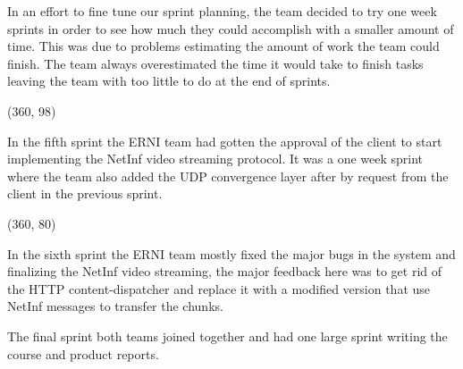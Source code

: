 In an effort to fine tune our sprint planning, the team decided to try one week sprints in order to see how much they could accomplish with a smaller amount of time. This was due to problems estimating the amount of work the team could finish. The team always overestimated the time it would take to finish tasks leaving the team with too little to do at the end of sprints.

\framebox(360, 98){
	
}

In the fifth sprint the ERNI team had gotten the approval of the client to start implementing the NetInf video streaming protocol. It was a one week sprint where the team also added the UDP convergence layer after by request from the client in the previous sprint.


\framebox(360, 80){
}

In the sixth sprint the ERNI team mostly fixed the major bugs in the system and finalizing the NetInf video streaming, the major feedback here was to get rid of the HTTP content-dispatcher and replace it with a modified version that use NetInf messages to transfer the chunks.

The final sprint both teams joined together and had one large sprint writing the course and product reports.
